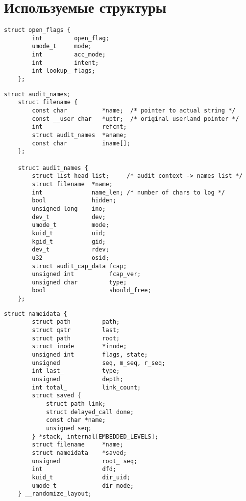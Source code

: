 \chapter{Используемые структуры}

\begin{center}
\captionsetup{justification=raggedright,singlelinecheck=off}
\begin{lstlisting}[label=lst:add,caption=struct open\_flags]
    struct open_flags {
        int         open_flag;
        umode_t     mode;
        int         acc_mode;
        int         intent;
        int lookup_ flags;
    };
\end{lstlisting}
\end{center}

\begin{center}
\captionsetup{justification=raggedright,singlelinecheck=off}
\begin{lstlisting}[label=lst:add,caption=struct filename и 
 struct audit\_names]
    struct audit_names;
    struct filename {
        const char          *name;  /* pointer to actual string */
        const __user char   *uptr;  /* original userland pointer */
        int                 refcnt;
        struct audit_names  *aname;
        const char          iname[];
    };
    
    struct audit_names {
        struct list_head list;     /* audit_context -> names_list */
        struct filename  *name;
        int              name_len; /* number of chars to log */
        bool             hidden; 
        unsigned long    ino;
        dev_t            dev;
        umode_t          mode;
        kuid_t           uid;
        kgid_t           gid;
        dev_t            rdev;
        u32              osid;
        struct audit_cap_data fcap;
        unsigned int          fcap_ver;
        unsigned char         type;
        bool                  should_free;
    };
\end{lstlisting}
\end{center}

\begin{center}
\captionsetup{justification=raggedright,singlelinecheck=off}
\begin{lstlisting}[label=lst:add,caption=struct nameidata]
    struct nameidata {
        struct path         path;
        struct qstr         last;
        struct path         root;
        struct inode        *inode;
        unsigned int        flags, state;
        unsigned            seq, m_seq, r_seq;
        int last_           type;
        unsigned            depth;
        int total_          link_count;
        struct saved {
            struct path link;
            struct delayed_call done;
            const char *name;
            unsigned seq;
        } *stack, internal[EMBEDDED_LEVELS];
        struct filename     *name;
        struct nameidata    *saved;
        unsigned            root_ seq;
        int                 dfd;
        kuid_t              dir_uid;
        umode_t             dir_mode;
    } __randomize_layout;
\end{lstlisting}
\end{center}